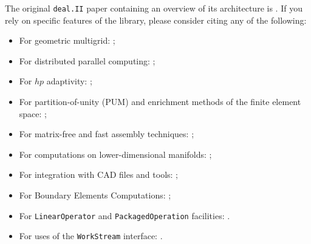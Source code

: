 \documentclass{ansarticle-preprint}
\newcommand{\specialword}[1]{\texttt{#1}}
\newcommand{\dealii}{{\specialword{deal.II}}\xspace}
\begin{document}
The original \texttt{\dealii} paper containing an overview of its
architecture is \cite{BangerthHartmannKanschat2007}. If you rely on
specific features of the library, please consider citing any of the
following:
\begin{itemize}
 \item For geometric multigrid: \cite{Kanschat2004,JanssenKanschat2011,ClevengerHeisterKanschatKronbichler2019,KronbichlerLjungkvist2019};
 \item For distributed parallel computing: \cite{BangerthBursteddeHeisterKronbichler11};
 \item For $hp$ adaptivity: \cite{BangerthKayserHerold2007};
  \item For partition-of-unity (PUM) and enrichment methods of the
    finite element space: \cite{Davydov2016};
 \item For matrix-free and fast assembly techniques:
   \cite{KronbichlerKormann2012,KronbichlerKormann2019};
 \item For computations on lower-dimensional manifolds:
   \cite{DeSimoneHeltaiManigrasso2009};
 \item For integration with CAD files and tools:
   \cite{HeltaiMola2015};
 \item For Boundary Elements Computations:
   \cite{GiulianiMolaHeltai-2018-a};
 \item For \texttt{LinearOperator} and \texttt{PackagedOperation} facilities:
   \cite{MaierBardelloniHeltai-2016-a,MaierBardelloniHeltai-2016-b}.
 \item For uses of the \texttt{WorkStream} interface:
   \cite{TKB16}.
\end{itemize}
\end{document}
